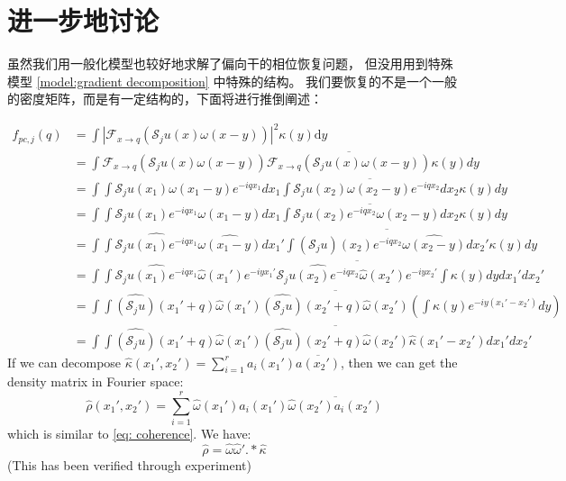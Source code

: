 \documentclass{article}
\numberwithin{equation}{section}
\begin{document}
  
  \section{进一步地讨论}
  
  虽然我们用一般化模型也较好地求解了偏向干的相位恢复问题， 但没用用到特殊模型 \ref{model:gradient decomposition} 中特殊的结构。 我们要恢复的不是一个一般的密度矩阵，而是有一定结构的，下面将进行推倒阐述：
  
  \begin{equation}
  \begin{aligned}
  f_{p c, j}(q) &= \int\left|\mathcal{F}_{x \rightarrow q}\left(\mathcal{S}_{j} u(x) \omega(x-y)\right)\right|^{2} \kappa(y) \mathrm{d} y\\
  &= \int \mathcal{F}_{x \rightarrow q}\left(\mathcal{S}_{j} u(x) \omega(x-y)\right) \overline{ \mathcal{F}_{x \rightarrow q}\left(\mathcal{S}_{j} u(x) \omega(x-y)\right) }  \kappa(y)     dy\\
   &= \int \int \mathcal{S}_{j} u(x_1) \omega(x_1-y) e^{-iqx_1} dx_1 \overline{ \int \mathcal{S}_{j} u(x_2) \omega(x_2-y) e^{-iqx_2}dx_2 }  \kappa(y)   dy \\
   &= \int \int \mathcal{S}_{j} u(x_1)e^{-iqx_1} \omega(x_1-y)  dx_1 \overline{ \int \mathcal{S}_{j} u(x_2)e^{-iqx_2} \omega(x_2-y) dx_2 }  \kappa(y)   dy\\
   &= \int \int \widehat{\mathcal{S}_{j} u(x_1)e^{-iqx_1}} \widehat{\omega(x_1-y)}  dx_1' \overline{ \int \widehat{(\mathcal{S}_{j}u)(x_2) e^{-iqx_2} }  \widehat{\omega(x_2-y)} dx_2' } \kappa(y)   dy\\
  & = \int\int  
   \widehat{\mathcal{S}_{j} u(x_1)e^{-iqx_1}} \widehat{\omega}(x_1')e^{-iyx_1'}  \overline{ \widehat{\mathcal{S}_{j} u(x_2)e^{-iqx_2}} \widehat{\omega}(x_2')e^{-iyx_2'} }   \int   \kappa(y)   dy
  dx_1' dx_2' \\
  & =  \int\int  
  \widehat{(\mathcal{S}_{j}u)}(x_1' + q) \widehat{\omega}(x_1')   \overline{ \widehat{(\mathcal{S}_{j}u)}(x_2' + q) \widehat{\omega}(x_2') }   (\int   \kappa(y)e^{-iy(x_1'-x_2')}  dy ) \\
  & = \int\int  
  \widehat{(\mathcal{S}_{j}u)}(x_1' + q) \widehat{\omega}(x_1')   \overline{ \widehat{(\mathcal{S}_{j}u)}(x_2' + q) \widehat{\omega}(x_2') }    \hat{\kappa}(x_1'-x_2')  
dx_1' dx_2'
  \end{aligned}
  \end{equation}
  If we can decompose $\hat{\kappa}(x_1',x_2') = \sum_{i=1}^r a_i(x_1') \overline{a(x_2')}$, then we can get the density matrix in Fourier space:
  $$
  \hat{\rho}(x_1',x_2') = \sum_{i=1}^{r} \hat{\omega}(x_1')a_i(x_1') \overline{\hat{\omega}(x_2')a_i(x_2')}
  $$
  which is similar to \ref{eq: coherence}. We have:
  $$
   \hat{\rho}  = \hat{\omega}\hat{\omega}' .* \hat{\kappa}
  $$
  (This has been verified through experiment)
  
\end{document}
